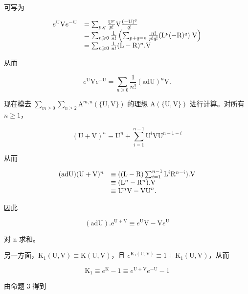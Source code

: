  可写为

\[
\begin{array}{r l} e ^ {\mathrm{U}} \mathrm{V} e ^ {- \mathrm{U}} & = \sum_ {p, q} \frac {\mathrm{U} ^ {p}}{p !} \mathrm{V} \frac {(- \mathrm{U}) ^ {q}}{q !} \\ & = \sum_ {n \geqslant 0} \frac {1}{n !} \left(\sum_ {p + q = n} \frac {n !}{p ! q !} (\mathrm{L} ^ {p} (- \mathrm{R}) ^ {q}). \mathrm{V}\right) \\ & = \sum_ {n \geqslant 0} \frac {1}{n !} (\mathrm{L} - \mathrm{R}) ^ {n}. \mathrm{V} \end{array}
\]

从而

\[
e ^ {\mathrm{U}} \mathrm{V} e ^ {- \mathrm{U}} = \sum_ {n \geqslant 0} \frac {1}{n !} (\mathrm{adU}) ^ {n} \mathrm{V}.\tag{22}
\]

现在模去 \(\sum_{m\geqslant 0}\sum_{n\geqslant 2}\mathrm{A}^{m,n}(\{\mathrm{U},\mathrm{V}\})\) 的理想 \(\mathrm{A}(\{\mathrm{U},\mathrm{V}\})\) 进行计算。对所有 \(n\geqslant 1\)，

\[
(\mathrm{U} + \mathrm{V}) ^ {n} \equiv \mathrm{U} ^ {n} + \sum_ {i = 1} ^ {n - 1} \mathrm{U} ^ {i} \mathrm{V} \mathrm{U} ^ {n - 1 - i}
\]

从而

\[
\begin{array}{r l} (\mathrm{adU}) (\mathrm{U} + \mathrm{V}) ^ {n} & \equiv ((\mathrm{L} - \mathrm{R}) \sum_ {i = 1} ^ {n - 1} \mathrm{L} ^ {i} \mathrm{R} ^ {n - i}). \mathrm{V} \\ & \equiv (\mathrm{L} ^ {n} - \mathrm{R} ^ {n}). \mathrm{V} \\ & \equiv \mathrm{U} ^ {n} \mathrm{V} - \mathrm{VU} ^ {n}. \end{array}
\]

因此

\[
(\mathrm{ad} \mathrm{U}). \mathrm{e} ^ {\mathrm{U} + \mathrm{V}} \equiv e ^ {\mathrm{U}} \mathrm{V} - \mathrm{V} e ^ {\mathrm{U}}\tag{23}
\]

对 n 求和。

另一方面，\(\mathrm{K}_1(\mathrm{U},\mathrm{V})\equiv \mathrm{K}(\mathrm{U},\mathrm{V})\)，且 \(e^{\mathrm{K}_1(\mathrm{U},\mathrm{V})}\equiv 1 + \mathrm{K}_1(\mathrm{U},\mathrm{V})\)，从而

\[
\mathrm{K} _ {1} \equiv e ^ {\mathrm{K}} - 1 \equiv e ^ {\mathrm{U} + \mathrm{V}} e ^ {- \mathrm{U}} - 1
\]

由命题 3 得到

